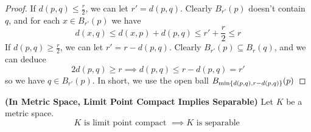 \documentclass{report}
\begin{document}
\begin{proof}
If $d(p,q)\leq \frac{r}{2}$, we can let $r'=d(p,q)$. Clearly $B_{r'}(p)$ doesn't contain $q$, and for each  $x\in B_{r'}(p)$ we have
\begin{equation}
d(x,q)\leq d(x,p)+d(p,q)\leq r'+\frac{r}{2}\leq r
\end{equation}
If $d(p,q)\geq \frac{r}{2}$, we can let $r'=r-d(p,q)$. Clearly $B_{r'}(p)\subseteq B_r(q)$, and we can deduce
\begin{equation}
2d(p,q)\geq r\implies d(p,q)\leq r-d(p,q)=r'
\end{equation}
so we have $q\in B_{r'}(p)$. In short, we use the open ball  $B_{\min \{ d(p,q),r-d(p,q) \}}(p)$
\end{proof}
\begin{theorem}
\label{2.7.3}
\textbf{(In Metric Space, Limit Point Compact Implies Separable)} Let $K$ be a metric space.
\begin{equation}
K\text{ is limit point compact }\implies K\text{ is separable }
\end{equation}
\end{theorem}
\end{document}
